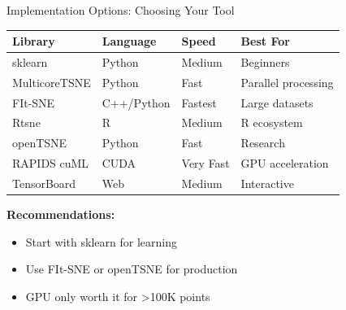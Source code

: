 \documentclass[aspectratio=169]{beamer}
\begin{document}
\begin{frame}{Implementation Options: Choosing Your Tool}
\begin{center}
\begin{tabular}{l|l|l|l}
\textbf{Library} & \textbf{Language} & \textbf{Speed} & \textbf{Best For}\\
\hline
sklearn & Python & Medium & Beginners\\
MulticoreTSNE & Python & Fast & Parallel processing\\
FIt-SNE & C++/Python & Fastest & Large datasets\\
Rtsne & R & Medium & R ecosystem\\
openTSNE & Python & Fast & Research\\
RAPIDS cuML & CUDA & Very Fast & GPU acceleration\\
TensorBoard & Web & Medium & Interactive
\end{tabular}
\end{center}

\textbf{Recommendations:}
\begin{itemize}
\item Start with sklearn for learning
\item Use FIt-SNE or openTSNE for production
\item GPU only worth it for >100K points
\end{itemize}
\end{frame}
\end{document}
